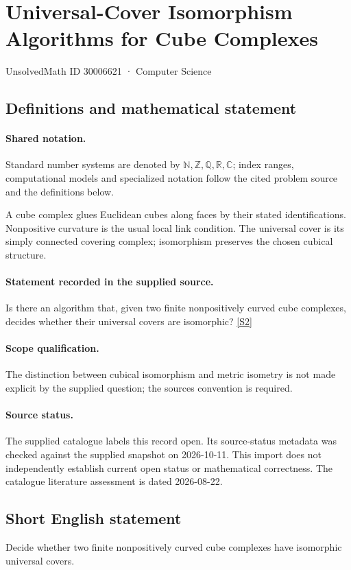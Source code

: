 \documentclass[11pt]{article}
\newcommand{\sref}[2]{\hyperlink{source:#1:#2}{[S#2]}}
\begin{document}
\setcounter{section}{30006620}
\section{Universal-Cover Isomorphism Algorithms for Cube Complexes}\label{30006621}
{\small\sffamily UnsolvedMath ID 30006621 · Computer Science}
\subsection{Definitions and mathematical statement}

\paragraph{Shared notation.}Standard number systems are denoted by $\mathbb N,\mathbb Z,\mathbb Q,\mathbb R,\mathbb C$; index ranges, computational models and specialized notation follow the cited problem source and the definitions below.


A cube complex glues Euclidean cubes along faces by their stated identifications. Nonpositive curvature is the usual local link condition. The universal cover is its simply connected covering complex; isomorphism preserves the chosen cubical structure.
\paragraph{Statement recorded in the supplied source.}
Is there an algorithm that, given two finite nonpositively curved cube complexes, decides whether their universal covers are isomorphic? \sref{30006621}{2}
\paragraph{Scope qualification.}
The distinction between cubical isomorphism and metric isometry is not made explicit by the supplied question; the source\textquotesingle s convention is required.
\paragraph{Source status.}
The supplied catalogue labels this record open. Its source-status metadata was checked against the supplied snapshot on 2026-10-11. This import does not independently establish current open status or mathematical correctness. The catalogue literature assessment is dated 2026-08-22.
\subsection{Short English statement}
Decide whether two finite nonpositively curved cube complexes have isomorphic universal covers.
\end{document}
